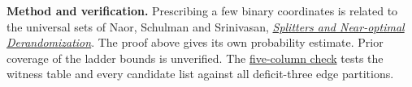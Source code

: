 \documentclass[11pt]{article}
\begin{document}
\small\noindent
\textbf{Method and verification.}
Prescribing a few binary coordinates is related to the universal sets of
Naor, Schulman and Srinivasan,
\href{https://authors.library.caltech.edu/records/wq91j-3w168}{\emph{Splitters and Near-optimal Derandomization}}.
The proof above gives its own probability estimate. Prior coverage of the
ladder bounds is unverified. The
\href{https://github.com/Akhil-rav/discrete-math-lab/blob/main/tests/test_ladder_test_families.py}{five-column check}
tests the witness table and every candidate list against all deficit-three
edge partitions.
\end{document}
